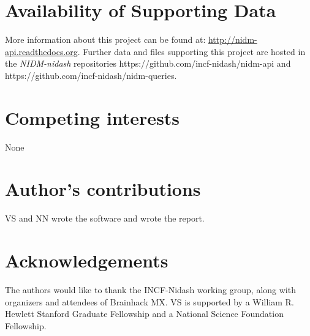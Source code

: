 \documentclass[twocolumn]{bmcart}%
\begin{document}
\begin{backmatter}

\section*{Availability of Supporting Data}
More information about this project can be found at: \url{http://nidm-api.readthedocs.org}. Further data and files supporting this project are hosted in the \emph{NIDM-nidash} repositories https://github.com/incf-nidash/nidm-api and https://github.com/incf-nidash/nidm-queries.

\section*{Competing interests}
None

\section*{Author's contributions}
VS and NN wrote the software and wrote the report.

\section*{Acknowledgements}
The authors would like to thank the INCF-Nidash working group, along with organizers and attendees of
Brainhack MX. VS is supported by a William R. Hewlett Stanford Graduate Fellowship and a National Science Foundation Fellowship. 
  


\end{backmatter}
\end{document}
